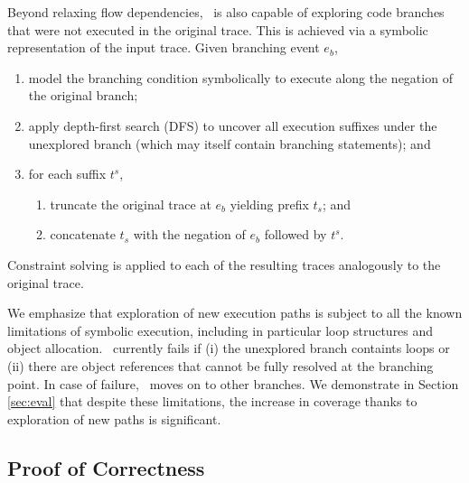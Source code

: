Beyond relaxing flow dependencies, \tool\ is also capable of exploring code branches that were not executed in the original trace. This is achieved via a symbolic representation of the input trace. Given branching event $e_b$,
\begin{enumerate}
	\item model the branching condition symbolically to execute along the negation of the original branch;
	\item apply depth-first search (DFS) to uncover all execution suffixes under the unexplored branch (which may itself contain branching statements); and
	\item for each suffix $t^s$,
	\begin{enumerate}
		\item truncate the original trace at $e_b$ yielding prefix $t_s$; and
		\item concatenate $t_s$ with the negation of $e_b$ followed by $t^s$.
	\end{enumerate}
\end{enumerate}
Constraint solving is applied to each of the resulting traces analogously to the original trace.

We emphasize that exploration of new execution paths is subject to all the known limitations of symbolic execution, including in particular loop structures and object allocation. \tool\ currently fails if (i) the unexplored branch containts loops or (ii) there are object references that cannot be fully resolved at the branching point. In case of failure, \tool\ moves on to other branches. We demonstrate in Section \ref{sec:eval} that despite these limitations, the increase in coverage thanks to exploration of new paths is significant.

\subsection{Proof of Correctness}


